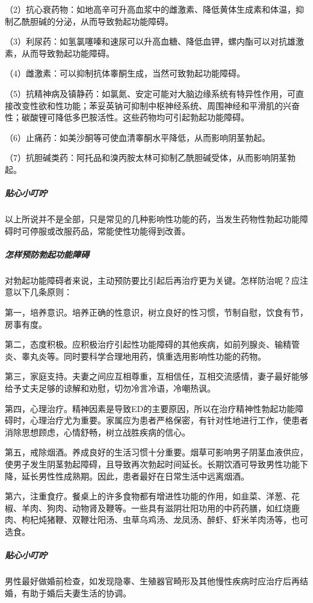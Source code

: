 （2）抗心衰药物：如地高辛可升高血浆中的雌激素、降低黄体生成素和体温，抑制乙酰胆碱的分泌，从而导致勃起功能障碍。

（3）利尿药：如氢氯噻嗪和速尿可以升高血糖、降低血钾，螺内酯可以对抗雄激素，从而导致勃起功能障碍。

（4）雌激素：可以抑制抗体睾酮生成，当然可致勃起功能障碍。

（5）抗精神病及镇静药：如氯氮、安定可能对大脑边缘系统有特异性作用，可直接改变性欲和性功能；苯妥英钠可抑制中枢神经系统、周围神经和平滑肌的兴奋性；碳酸锂可降低多巴胺活性。这些药物均可引起勃起功能障碍。

（6）止痛药：如美沙酮等可使血清睾酮水平降低，从而影响阴茎勃起。

（7）抗胆碱类药：阿托品和溴丙胺太林可抑制乙酰胆碱受体，从而影响阴茎勃起。

\subparagraph{贴心小叮咛}

以上所说并不是全部，只是常见的几种影响性功能的药，当发生药物性勃起功能障碍时可停服或改服药品，常能使性功能得到改善。

\subparagraph{怎样预防勃起功能障碍}

对勃起功能障碍者来说，主动预防要比引起后再治疗更为关键。怎样防治呢？应注意以下几条原则：

第一，培养意识。培养正确的性意识，树立良好的性习惯，节制自慰，饮食有节，房事有度。

第二，态度积极。应积极治疗引起性功能障碍的其他疾病，如前列腺炎、输精管炎、睾丸炎等。同时要科学合理地用药，慎重选用影响性功能的药物。

第三，家庭支持。夫妻之间应互相尊重，互相信任，互相交流感情，妻子最好能够给予丈夫足够的谅解和劝慰，切勿冷言冷语，冷嘲热讽。

第四，心理治疗。精神因素是导致ED的主要原因，所以在治疗精神性勃起功能障碍时，心理治疗尤为重要。家属应为患者严格保密，有针对性地进行工作，使患者消除思想顾虑，心情舒畅，树立战胜疾病的信心。

第五，戒除烟酒。养成良好的生活习惯十分重要。烟草可影响男子阴茎血液供应，使男子发生阴茎勃起障碍，且导致再次勃起时间延长。长期饮酒可导致男性功能下降，延长男性性成熟期。因此，患者最好在日常生活中远离烟酒。

第六，注重食疗。餐桌上的许多食物都有增进性功能的作用，如韭菜、洋葱、花椒、羊肉、狗肉、动物肾及鞭等。一些具有滋阴壮阳功用的中药药膳，如红烧鹿肉、枸杞炖猪鞭、双鞭壮阳汤、虫草乌鸡汤、龙凤汤、醉虾、虾米羊肉汤等，也可选食。

\subparagraph{贴心小叮咛}

男性最好做婚前检查，如发现隐睾、生殖器官畸形及其他慢性疾病时应治疗后再结婚，有助于婚后夫妻生活的协调。

